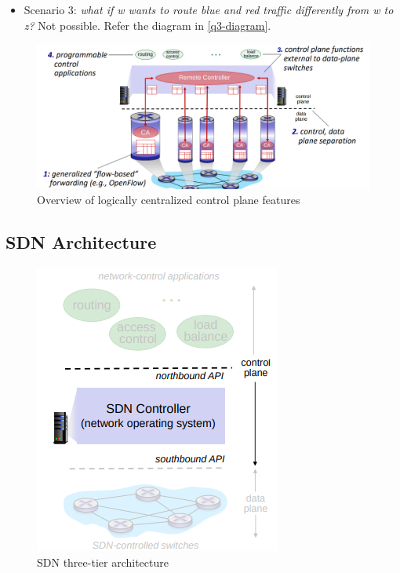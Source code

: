 \documentclass[10pt,a4paper]{report}
\theoremstyle{definition}
\begin{document}
\begin{itemize}
	\item Scenario 3: \textit{what if w wants to route blue and red traffic differently from w to z?} Not possible. Refer the diagram in \ref{q3-diagram}. 
\end{itemize}

\begin{figure}
	\centering\includegraphics[scale=0.30]{images/Pasted image 20230322110317.png}
	\caption{Overview of logically centralized control plane features}
\end{figure}

\subsection{SDN Architecture}\label{sec:sdn-architecture}
\begin{figure}[h]
	\centering\includegraphics[scale=0.70]{images/Pasted image 20230322110445.png}
	\caption{SDN three-tier architecture}
	\label{sdn-three-layer-architecture}
\end{figure}
\end{document}
